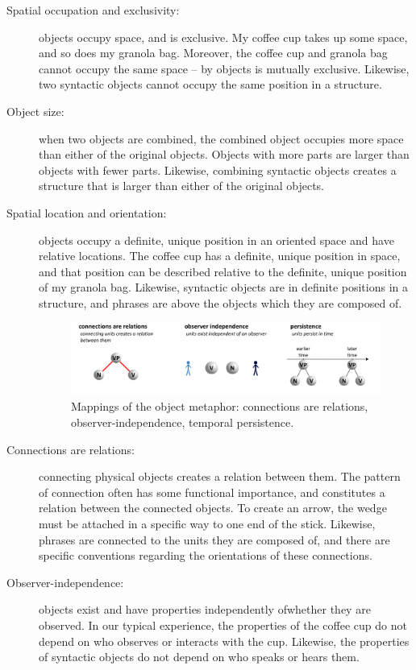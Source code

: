 \begin{description}
\item[Spatial occupation and exclusivity:] objects occupy space, and  is exclusive. My coffee cup takes up some space, and so does my granola bag. Moreover, the coffee cup and granola bag cannot occupy the same space --  by objects is mutually exclusive. Likewise, two syntactic objects cannot occupy the same position in a structure. 

\item[Object size:] when two objects are combined, the combined object occupies more space than either of the original objects. Objects with more parts are larger than objects with fewer parts. Likewise, combining syntactic objects creates a structure that is larger than either of the original objects.

\item[Spatial location and orientation:] objects occupy a definite, unique position in an oriented space and have relative locations. The coffee cup has a definite, unique position in space, and that position can be described relative to the definite, unique position of my granola bag. Likewise, syntactic objects are in definite positions in a structure, and phrases are above the objects which they are composed of.

  
\begin{figure}[H]
\includegraphics[width=\textwidth]{figures/Tilsen-img31.png}
\caption{Mappings of the object metaphor: connections are relations, observer-independence, temporal persistence.}
\label{fig:3:3}
\end{figure}
 

\item[Connections are relations:] connecting physical objects creates a relation between them. The pattern of connection often has some functional importance, and constitutes a relation between the connected objects. To create an arrow, the wedge must be attached in a specific way to one end of the stick. Likewise, phrases are connected to the units they are composed of, and there are specific conventions regarding the orientations of these connections.

\item[Observer-independence:] objects exist and have properties independently of\linebreak whether they are observed. In our typical experience, the properties of the coffee cup do not depend on who observes or interacts with the cup. Likewise, the properties of syntactic objects do not depend on who speaks or hears them.


\end{description}
